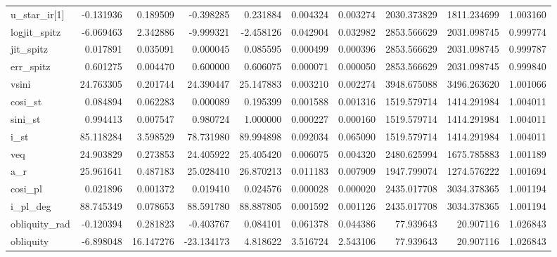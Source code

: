 \begin{tabular}{lrrrrrrrrr}
u\_star\_ir[1]  &   -0.131936 &   0.189509 &   -0.398285 &    0.231884 &   0.004324 &   0.003274 &  2030.373829 &  1811.234699 &  1.003160 \\
logjit\_spitz  &   -6.069463 &   2.342886 &   -9.999321 &   -2.458126 &   0.042904 &   0.032982 &  2853.566629 &  2031.098745 &  0.999774 \\
jit\_spitz     &    0.017891 &   0.035091 &    0.000045 &    0.085595 &   0.000499 &   0.000396 &  2853.566629 &  2031.098745 &  0.999787 \\
err\_spitz     &    0.601275 &   0.004470 &    0.600000 &    0.606075 &   0.000071 &   0.000050 &  2853.566629 &  2031.098745 &  0.999840 \\
vsini         &   24.763305 &   0.201744 &   24.390447 &   25.147883 &   0.003210 &   0.002274 &  3948.675088 &  3496.263620 &  1.001066 \\
cosi\_st       &    0.084894 &   0.062283 &    0.000089 &    0.195399 &   0.001588 &   0.001316 &  1519.579714 &  1414.291984 &  1.004011 \\
sini\_st       &    0.994413 &   0.007547 &    0.980724 &    1.000000 &   0.000227 &   0.000160 &  1519.579714 &  1414.291984 &  1.004011 \\
i\_st          &   85.118284 &   3.598529 &   78.731980 &   89.994898 &   0.092034 &   0.065090 &  1519.579714 &  1414.291984 &  1.004011 \\
veq           &   24.903829 &   0.273853 &   24.405922 &   25.405420 &   0.006075 &   0.004320 &  2480.625994 &  1675.785883 &  1.001189 \\
a\_r           &   25.961641 &   0.487183 &   25.028410 &   26.870213 &   0.011183 &   0.007909 &  1947.799074 &  1274.576222 &  1.001694 \\
cosi\_pl       &    0.021896 &   0.001372 &    0.019410 &    0.024576 &   0.000028 &   0.000020 &  2435.017708 &  3034.378365 &  1.001194 \\
i\_pl\_deg      &   88.745349 &   0.078653 &   88.591780 &   88.887805 &   0.001592 &   0.001126 &  2435.017708 &  3034.378365 &  1.001194 \\
obliquity\_rad &   -0.120394 &   0.281823 &   -0.403767 &    0.084101 &   0.061378 &   0.044386 &    77.939643 &    20.907116 &  1.026843 \\
obliquity     &   -6.898048 &  16.147276 &  -23.134173 &    4.818622 &   3.516724 &   2.543106 &    77.939643 &    20.907116 &  1.026843 \\
\bottomrule
\end{tabular}
